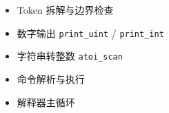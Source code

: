 
\begin{itemize}
    \item[\textbf{[ WIP ]}] Token 拆解与边界检查
    \item[\textbf{[ WIP ]}] 数字输出 \texttt{print\_uint} / \texttt{print\_int}
    \item[\textbf{[ WIP ]}] 字符串转整数 \texttt{atoi\_scan}
    \item[\textbf{[ WIP ]}] 命令解析与执行
    \item[\textbf{[ WIP ]}] 解释器主循环
\end{itemize}
